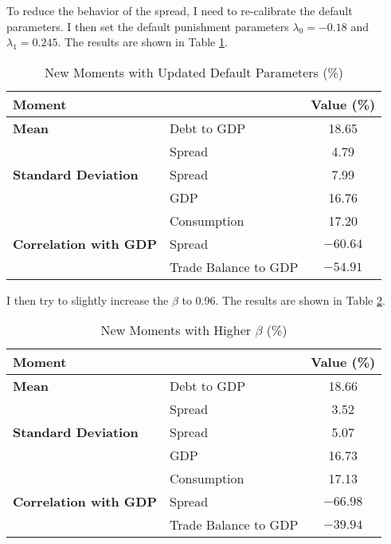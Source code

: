 \documentclass{article}
\begin{document}
To reduce the behavior of the spread, I need to re-calibrate the default
parameters. I then set the default punishment parameters $\lambda_0 = -0.18$
and $\lambda_1 = 0.245$. The results are shown in Table
\ref{tab:new_moments_2}.

\begin{table}[h]
    \centering
    \begin{tabular}{llc}
        \toprule
        \textbf{Moment}               &                      & \textbf{Value (\%)} \\
        \midrule
        \textbf{Mean}                 & Debt to GDP          & 18.65               \\
                                      & Spread               & 4.79                \\
        \addlinespace
        \textbf{Standard Deviation}   & Spread               & 7.99                \\
                                      & GDP                  & 16.76               \\
                                      & Consumption          & 17.20               \\
        \addlinespace
        \textbf{Correlation with GDP} & Spread               & $-60.64$            \\
                                      & Trade Balance to GDP & $-54.91$            \\
        \bottomrule
    \end{tabular}
    \caption{New Moments with Updated Default Parameters (\%)} \label{tab:new_moments_2}
\end{table}

I then try to slightly increase the $\beta$ to 0.96. The results are shown in
Table \ref{tab:new_moments_3}.

\begin{table}[h]
    \centering
    \begin{tabular}{llc}
        \toprule
        \textbf{Moment}               &                      & \textbf{Value (\%)} \\
        \midrule
        \textbf{Mean}                 & Debt to GDP          & 18.66               \\
                                      & Spread               & 3.52                \\
        \addlinespace
        \textbf{Standard Deviation}   & Spread               & 5.07                \\
                                      & GDP                  & 16.73               \\
                                      & Consumption          & 17.13               \\
        \addlinespace
        \textbf{Correlation with GDP} & Spread               & $-66.98$            \\
                                      & Trade Balance to GDP & $-39.94$            \\
        \bottomrule
    \end{tabular}
    \caption{New Moments with Higher $\beta$ (\%)} \label{tab:new_moments_3}
\end{table}
\end{document}
